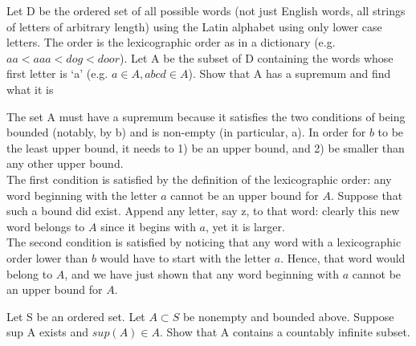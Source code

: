 \documentclass[11 pt]{article}
\begin{document}
\pagebreak
\begin{problem}
	Let D be the ordered set of all possible words (not just English words, all
strings of letters of arbitrary length) using the Latin alphabet using only lower case
letters. The order is the lexicographic order as in a dictionary (e.g. $aa < aaa < dog < door$). Let A be the subset of D containing the words whose first letter is ‘a’
(e.g. $a\in A, abcd\in A$). Show that A has a supremum and find what it is
\end{problem}
\begin{solution}
	The set A must have a supremum because it satisfies the two conditions of being bounded (notably, by b) and is non-empty (in particular, a).
	In order for $b$ to be the least upper bound, it needs to 1) be an upper bound, and 2) be smaller than any other upper bound.\\
	The first condition is satisfied by the definition of the lexicographic order: any word beginning with the letter $a$ cannot be an upper bound for $A$. Suppose that such a bound did exist. Append any letter, say z, to that word: clearly this new word belongs to $A$ since it begins with  $a$, yet it is larger. \\
	The second condition is satisfied by noticing that any word with a lexicographic order lower than $b$ would have to start with the letter $a$. Hence, that word would belong to $A$, and we have just shown that any word beginning with $a$ cannot be an upper bound for $A$. 
\end{solution}
\pagebreak
\begin{problem}
	Let S be an ordered set. Let $A\subset S$ be nonempty and bounded above. Suppose
sup A exists and $sup(A)\in A$. Show that A contains a countably infinite subset.
\end{problem}
\end{document}

